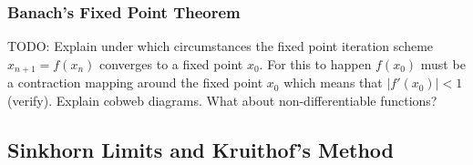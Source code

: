 

\subsubsection{Banach's Fixed Point Theorem}
TODO: Explain under which circumstances the fixed point iteration scheme $x_{n+1} = f(x_n)$ converges to a fixed point $x_0$. For this to happen $f(x_0)$ must be a contraction mapping around the fixed point $x_0$ which means that $|f'(x_0)| < 1$ (verify). Explain cobweb diagrams. What about non-differentiable functions?


\subsection{Sinkhorn Limits and Kruithof's Method}



